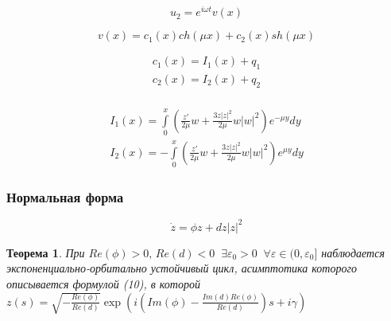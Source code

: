 \documentclass[fullscreen=true, unicode, bookmarks=false]{beamer}
\newtheorem{rustheorem}{Теорема }
\begin{document}
\begin{frame}		

$$ u_{2}=e^{i \omega t} v(x) $$
	
\medskip	
	
$$ v(x) = c_{1}(x) ch(\mu x) + c_{2}(x) sh(\mu x) $$

\medskip	
	
	\begin{equation}
		\begin{aligned}
			c_{1}(x) = I_{1}(x) + q_{1} \\
			c_{2}(x) = I_{2}(x) + q_{2} \\
		\end{aligned}
	\end{equation}

\medskip
	
	\begin{equation}
		\begin{aligned}
			I_{1}(x) = \int\limits_0^x \left( \frac{z'}{2\mu}w +\frac{3z|z|^2}{2\mu}w|w|^2 \right) e^{-\mu y} dy \\
			I_{2}(x) = -\int\limits_0^x \left( \frac{z'}{2\mu}w +\frac{3z|z|^2}{2\mu}w|w|^2 \right) e^{\mu y} dy
		\end{aligned}
	\end{equation}
	
\end{frame}


\begin{frame}
\frametitle{Нормальная форма}

\begin{equation} \label{norm_form}
	\dot{z} = \phi z + d z |z|^2
\end{equation}

\vspace{1.5cm}
	
\begin{rustheorem}
	При $ Re(\phi)>0,\, Re(d)<0 \;\; \exists \varepsilon_0 > 0 \;\; \forall \varepsilon \in (0,\varepsilon_0] $
	наблюдается экспоненциально-орбитально устойчивый цикл, 
	асимптотика которого описывается формулой (10), в которой
	$z(s) = \sqrt{-\frac{Re(\phi)}{Re(d)}} \exp{\left(i \left(Im(\phi) -
	 \frac{Im(d)Re(\phi)}{Re(d)} \right) s + i\gamma \right)} $
\end{rustheorem}
\end{frame}
\end{document}
